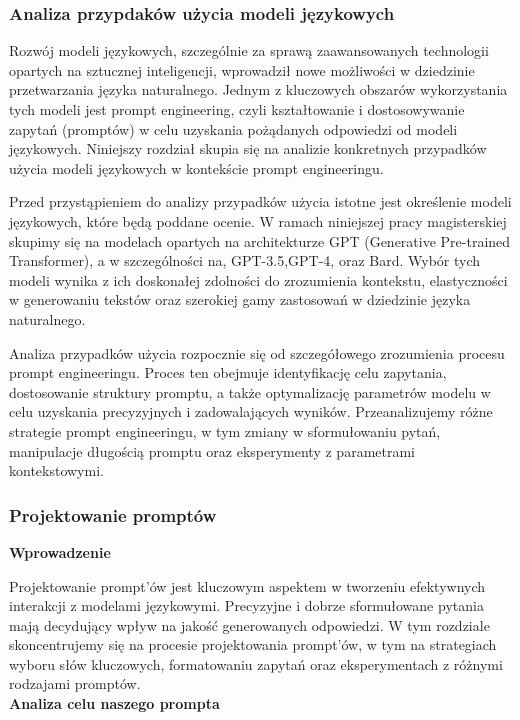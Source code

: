 \subsubsection{Analiza przypdaków użycia modeli językowych}

Rozwój modeli językowych, szczególnie za sprawą zaawansowanych technologii opartych na sztucznej inteligencji, wprowadził nowe możliwości w dziedzinie przetwarzania języka naturalnego. Jednym z kluczowych obszarów wykorzystania tych modeli jest prompt engineering, czyli kształtowanie i dostosowywanie zapytań (promptów) w celu uzyskania pożądanych odpowiedzi od modeli językowych. Niniejszy rozdział skupia się na analizie konkretnych przypadków użycia modeli językowych w kontekście prompt engineeringu.

Przed przystąpieniem do analizy przypadków użycia istotne jest określenie modeli językowych, które będą poddane ocenie. W ramach niniejszej pracy magisterskiej skupimy się na modelach opartych na architekturze GPT (Generative Pre-trained Transformer), a w szczególności na, GPT-3.5,GPT-4, oraz Bard. Wybór tych modeli wynika z ich doskonałej zdolności do zrozumienia kontekstu, elastyczności w generowaniu tekstów oraz szerokiej gamy zastosowań w dziedzinie języka naturalnego.

Analiza przypadków użycia rozpocznie się od szczegółowego zrozumienia procesu prompt engineeringu. Proces ten obejmuje identyfikację celu zapytania, dostosowanie struktury promptu, a także optymalizację parametrów modelu w celu uzyskania precyzyjnych i zadowalających wyników. Przeanalizujemy różne strategie prompt engineeringu, w tym zmiany w sformułowaniu pytań, manipulacje długością promptu oraz eksperymenty z parametrami kontekstowymi.

\subsubsection{Projektowanie promptów}

\noindent\textbf{Wprowadzenie}

Projektowanie prompt'ów jest kluczowym aspektem w tworzeniu efektywnych interakcji z modelami językowymi. Precyzyjne i dobrze sformułowane pytania mają decydujący wpływ na jakość generowanych odpowiedzi. W tym rozdziale skoncentrujemy się na procesie projektowania prompt'ów, w tym na strategiach wyboru słów kluczowych, formatowaniu zapytań oraz eksperymentach z różnymi rodzajami promptów.
\\

\noindent\textbf{Analiza celu naszego prompta}

